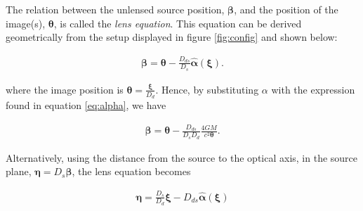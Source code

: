 \documentclass[paper=a4, fontsize=11pt]{scrartcl} %
\numberwithin{equation}{section} %
\numberwithin{figure}{section} %
\numberwithin{table}{section} %
\begin{document}
The relation between the unlensed source position, $\boldsymbol \beta$, and the position of the image(s), $\boldsymbol \theta$, is called the \emph{lens equation}. This equation can be derived geometrically from the setup displayed in figure \ref{fig:config} and shown below:

\begin{eqnarray}
\label{eq:lens_eq_angle}
\boldsymbol \beta = \boldsymbol \theta - \frac{D_{ds}}{D_s} \hat{\boldsymbol \alpha}(\boldsymbol \xi).
\end{eqnarray}

 where the image position is $\boldsymbol \theta = \frac{\boldsymbol \xi}{D_{d}}$. Hence, by substituting $\alpha$ with the expression found in equation \ref{eq:alpha}, we have

 \begin{eqnarray}
 \label{eq:lens_equation}
 \boldsymbol \beta = \boldsymbol \theta - \frac{D_{ds}}{D_s D_d} \frac{4GM}{c^2 \boldsymbol \theta}.
 \end{eqnarray}

 Alternatively, using the distance from the source to the optical axis, in the source plane,  $\boldsymbol \eta = D_{s} \boldsymbol \beta$, the lens equation becomes

\begin{eqnarray}
\label{eq:lens_eq_distance}
\boldsymbol \eta = \frac{D_s}{D_d}\boldsymbol \xi - D_{ds}\hat{\boldsymbol \alpha}(\boldsymbol \xi)
\end{eqnarray}
\end{document}

